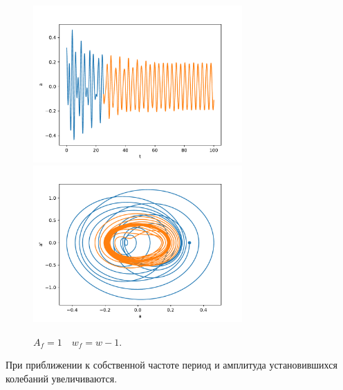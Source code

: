             \begin{figure}[H]
                \centering
                \includegraphics[width=8cm]{pictures/5resonance2.pdf}
                \includegraphics[width=8cm]{pictures/5resonance2p.pdf}
                \caption{$A_f = 1 \quad w_f = w-1$.}
            \end{figure}
            При приближении к собственной частоте период и амплитуда установившихся колебаний увеличиваются.


